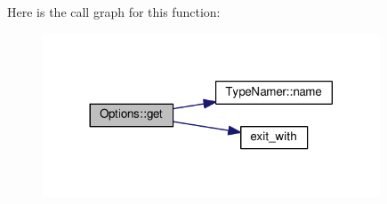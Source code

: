 Here is the call graph for this function\-:
\nopagebreak
\begin{figure}[H]
\begin{center}
\leavevmode
\includegraphics[width=284pt]{classOptions_a806470a0ddf00e44814367ff771ac33a_cgraph}
\end{center}
\end{figure}


